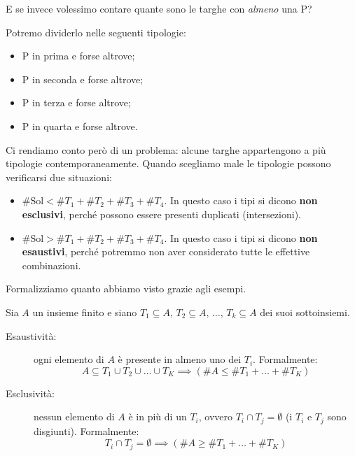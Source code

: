 \documentclass[12pt]{report}
\begin{document}
	E se invece volessimo contare quante sono le targhe con \textit{almeno} una P?
	
	Potremo dividerlo nelle seguenti tipologie:
	\begin{itemize}
		
		\item P in prima e forse altrove;
		
		\item P in seconda e forse altrove;
		
		\item P in terza e forse altrove;
		
		\item P in quarta e forse altrove.
	
	\end{itemize}
	
	Ci rendiamo conto però di un problema: alcune targhe appartengono a più tipologie contemporaneamente. Quando scegliamo male le tipologie possono verificarsi due situazioni:
	\begin{itemize}
		
		\item $\#\text{Sol} < \#T_1 + \#T_2 + \#T_3 + \#T_4$. In questo caso i tipi si dicono \textbf{non esclusivi}, perché possono essere presenti duplicati (intersezioni).
		
		\item $\#\text{Sol} > \#T_1 + \#T_2 + \#T_3 + \#T_4$. In questo caso i tipi si dicono \textbf{non esaustivi}, perché potremmo non aver considerato tutte le effettive combinazioni.
		
	\end{itemize}
	
	Formalizziamo quanto abbiamo visto grazie agli esempi.
	
	Sia $A$ un insieme finito e siano $T_1 \subseteq A, \, T_2 \subseteq A, \, \dots, \, T_k \subseteq A$ dei suoi sottoinsiemi.
	
	\begin{description}
		
		\item [Esaustività:] ogni elemento di $A$ è presente in almeno uno dei $T_i$. Formalmente:
		\[
		A \subseteq T_1 \cup T_2 \cup \dots \cup T_K \implies (\#A \leq \#T_1 + \dots + \#T_K)
		\]
		
		\item [Esclusività:] nessun elemento di $A$ è in più di un $T_i$, ovvero $T_i \cap T_j = \emptyset$ (i $T_i$ e $T_j$ sono disgiunti). Formalmente:
		\[
		T_i \cap T_j = \emptyset \implies (\#A \geq \#T_1 + \dots + \#T_K)
		\]
		
	\end{description}
	
\end{document}
